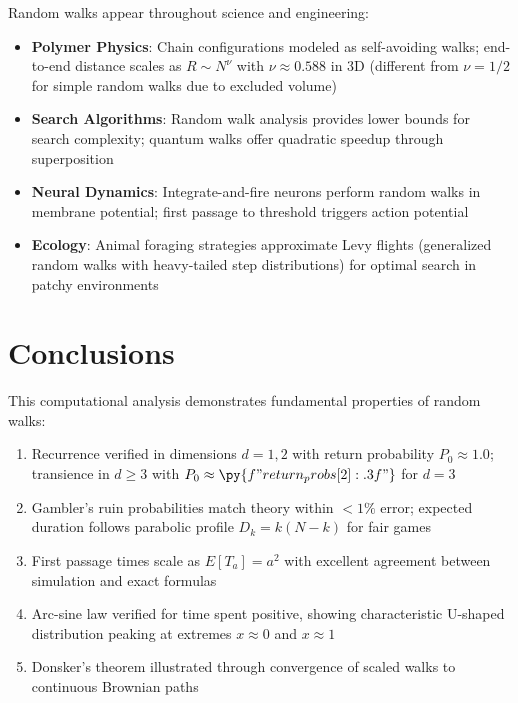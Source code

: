 \documentclass[a4paper, 11pt]{article}
\begin{document}
Random walks appear throughout science and engineering:

\begin{itemize}
\item \textbf{Polymer Physics}: Chain configurations modeled as self-avoiding walks; end-to-end
distance scales as $R \sim N^{\nu}$ with $\nu \approx 0.588$ in 3D (different from $\nu = 1/2$
for simple random walks due to excluded volume)

\item \textbf{Search Algorithms}: Random walk analysis provides lower bounds for search complexity;
quantum walks offer quadratic speedup through superposition

\item \textbf{Neural Dynamics}: Integrate-and-fire neurons perform random walks in membrane potential;
first passage to threshold triggers action potential

\item \textbf{Ecology}: Animal foraging strategies approximate Levy flights (generalized random walks
with heavy-tailed step distributions) for optimal search in patchy environments
\end{itemize}

\section{Conclusions}

This computational analysis demonstrates fundamental properties of random walks:

\begin{enumerate}
\item Recurrence verified in dimensions $d=1,2$ with return probability $P_0 \approx 1.0$; transience
in $d \geq 3$ with $P_0 \approx \py{f"{return_probs[2]:.3f}"}$ for $d=3$

\item Gambler's ruin probabilities match theory within $< 1\%$ error; expected duration follows
parabolic profile $D_k = k(N-k)$ for fair games

\item First passage times scale as $E[T_a] = a^2$ with excellent agreement between simulation and
exact formulas

\item Arc-sine law verified for time spent positive, showing characteristic U-shaped distribution
peaking at extremes $x \approx 0$ and $x \approx 1$

\item Donsker's theorem illustrated through convergence of scaled walks to continuous Brownian paths
\end{enumerate}
\end{document}
